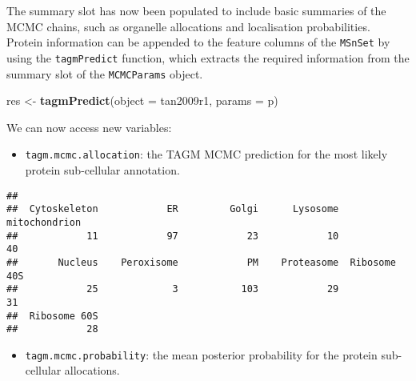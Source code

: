 \documentclass[9pt,a4paper,]{extarticle}
\newenvironment{Shaded}{\begin{snugshade}}{\end{snugshade}}
\newcommand{\DataTypeTok}[1]{\textcolor[rgb]{0.13,0.29,0.53}{#1}}
\newcommand{\KeywordTok}[1]{\textcolor[rgb]{0.13,0.29,0.53}{\textbf{#1}}}
\newcommand{\NormalTok}[1]{#1}
\newcommand{\OperatorTok}[1]{\textcolor[rgb]{0.81,0.36,0.00}{\textbf{#1}}}
\newcommand{\StringTok}[1]{\textcolor[rgb]{0.31,0.60,0.02}{#1}}
\begin{document}
The summary slot has now been populated to include basic summaries of
the MCMC chains, such as organelle allocations and localisation
probabilities. Protein information can be appended to the feature
columns of the \texttt{MSnSet} by using the \texttt{tagmPredict} function, which
extracts the required information from the summary slot of the
\texttt{MCMCParams} object.

\begin{Shaded}
\begin{Highlighting}[]
\NormalTok{res <-}\StringTok{ }\KeywordTok{tagmPredict}\NormalTok{(}\DataTypeTok{object =}\NormalTok{ tan2009r1, }\DataTypeTok{params =}\NormalTok{ p)}
\end{Highlighting}
\end{Shaded}

We can now access new variables:

\begin{itemize}
\item
  \texttt{tagm.mcmc.allocation}: the TAGM MCMC prediction for the most likely
  protein sub-cellular annotation.
\end{itemize}

\begin{Shaded}
\end{Shaded}

\begin{verbatim}
## 
##  Cytoskeleton            ER         Golgi      Lysosome mitochondrion 
##            11            97            23            10            40 
##       Nucleus    Peroxisome            PM    Proteasome  Ribosome 40S 
##            25             3           103            29            31 
##  Ribosome 60S 
##            28
\end{verbatim}

\begin{itemize}
\item
  \texttt{tagm.mcmc.probability}: the mean posterior probability for the protein
  sub-cellular allocations.
\end{itemize}

\begin{Shaded}
\end{Shaded}
\end{document}
